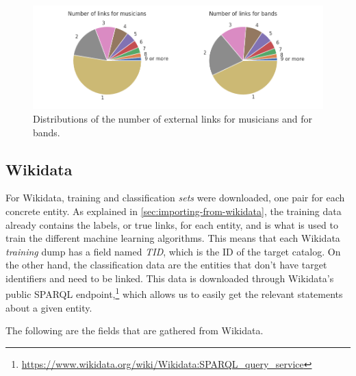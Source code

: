 \documentclass[epsfig,a4paper,11pt,titlepage,twoside,openany]{book}
\newcommand{\footurl}[1]{\footnote{\url{#1}}}
\begin{document}
\begin{figure}[H]
  \centering \includegraphics[width=\textwidth]{musicbrainz_number_of_links_musician_band} 
  \caption{Distributions of the number of external links for musicians and for bands.}
  \label{fig:musicbrainz-links-number-pie}
\end{figure}


\subsection{Wikidata}
\label{sec:shape-wikidata}


For Wikidata, training and classification \textit{sets} were downloaded, one pair for each concrete entity. As explained in \autoref{sec:importing-from-wikidata}, the training data already contains the labels, or true links, for each entity, and is what is used to train the different machine learning algorithms. This means that each Wikidata \textit{training} dump has a field named \textit{TID}, which is the ID of the target catalog. On the other hand, the classification data are the entities that don't have target identifiers and need to be linked. This data is downloaded through Wikidata's public SPARQL endpoint,\footurl{https://www.wikidata.org/wiki/Wikidata:SPARQL_query_service} which allows us to easily get the relevant statements about a given entity.

The following are the fields that are gathered from Wikidata. 
\end{document}
